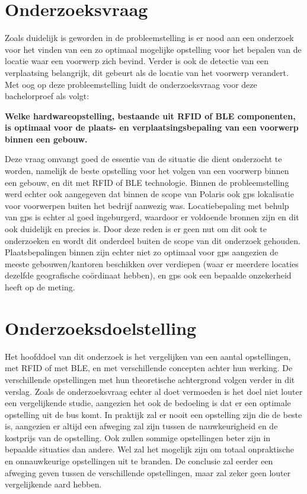 \section{Onderzoeksvraag}
\label{sec:onderzoeksvraag}

Zoals duidelijk is geworden in de probleemstelling is er nood aan een onderzoek voor het vinden van een zo optimaal mogelijke opstelling voor het bepalen van de locatie waar een voorwerp zich bevind. Verder is ook de detectie van een verplaatsing belangrijk, dit gebeurt als de locatie van het voorwerp verandert. Met oog op deze probleemstelling luidt de onderzoeksvraag voor deze bachelorproef als volgt:
\begin{center}
	\textbf{Welke hardwareopstelling, bestaande uit RFID of BLE componenten, is optimaal voor de plaats- en verplaatsingsbepaling van een voorwerp binnen een gebouw.}
\end{center}
Deze vraag omvangt goed de essentie van de situatie die dient onderzocht te worden, namelijk de beste opstelling voor het volgen van een voorwerp binnen een gebouw, en dit met RFID of BLE technologie. Binnen de probleemstelling werd echter ook aangegeven dat binnen de scope van Polaris ook gps lokalisatie voor voorwerpen buiten het bedrijf aanwezig was. Locatiebepaling met behulp van gps is echter al goed ingeburgerd, waardoor er voldoende bronnen zijn en dit ook duidelijk en precies is. Door deze reden is er geen nut om dit ook te onderzoeken en wordt dit onderdeel buiten de scope van dit onderzoek gehouden. Plaatsbepalingen binnen zijn echter niet zo optimaal voor gps aangezien de meeste gebouwen/kantoren beschikken over verdiepen (waar er meerdere locaties dezelfde geografische coördinaat hebben), en gps ook een bepaalde onzekerheid heeft op de meting.

\section{Onderzoeksdoelstelling}
\label{sec:onderzoeksdoelstelling}

Het hoofddoel van dit onderzoek is het vergelijken van een aantal opstellingen, met RFID of met BLE, en met verschillende concepten achter hun werking. De verschillende opstellingen met hun theoretische achtergrond volgen verder in dit verslag. Zoals de onderzoeksvraag echter al doet vermoeden is het doel niet louter een vergelijkende studie, aangezien het ook de bedoeling is dat er een optimale opstelling uit de bus komt. 
In praktijk zal er nooit een opstelling zijn die de beste is, aangezien er altijd een afweging zal zijn tussen de nauwkeurigheid en de kostprijs van de opstelling. Ook zullen sommige opstellingen beter zijn in bepaalde situaties dan andere. Wel zal het mogelijk zijn om totaal onpraktische en onnauwkeurige opstellingen uit te branden. De conclusie zal eerder een afweging geven tussen de verschillende opstellingen, maar zal zeker geen louter vergelijkende aard hebben.

